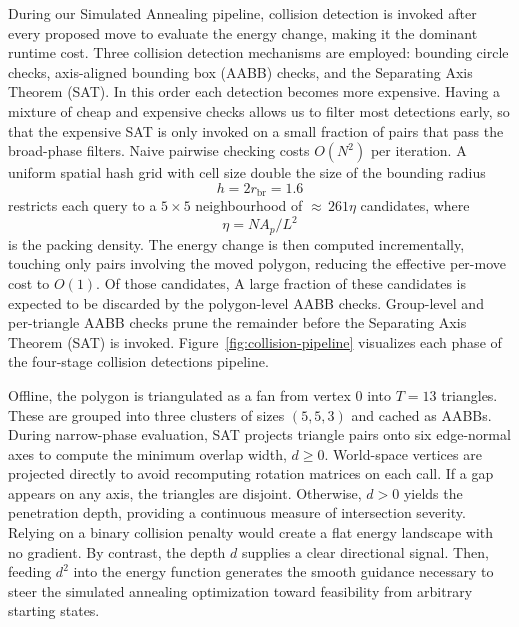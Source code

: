 \documentclass[10pt]{article}
\begin{document}
During our Simulated Annealing pipeline,
 collision detection is invoked after every proposed move to evaluate
the energy change, making it the dominant runtime cost. Three collision detection
mechanisms are employed: bounding circle checks,
 axis-aligned bounding box (AABB) checks,
  and the Separating Axis Theorem (SAT).
  In this order each detection becomes more expensive.
  Having a mixture of cheap and expensive checks allows us to 
  filter most detections early, so that the expensive SAT is only invoked on a small
   fraction of pairs that pass the broad-phase filters.
Naive pairwise checking costs $O(N^2)$ per iteration. 
A uniform spatial hash grid
with cell size double the size of the bounding radius $$h = 2r_{\mathrm{br}} = 1.6$$ restricts each query to a
$5 \times 5$ neighbourhood of ${\approx}\,261\eta$ candidates, where
$$\eta = NA_p/L^2$$ is the packing density. The energy change is then
computed incrementally, touching only pairs involving the moved
polygon, reducing the effective per-move cost to $O(1)$. Of those
candidates, A large fraction of these candidates is expected to be discarded by the
polygon-level AABB checks. Group-level and per-triangle
AABB checks prune the remainder before the Separating Axis Theorem
(SAT) is invoked. Figure~\ref{fig:collision-pipeline} visualizes
 each phase of the
four-stage collision detections pipeline.


Offline, the polygon is triangulated as a fan from vertex 0
 into $T = 13$ triangles. These are grouped into three clusters
  of sizes $(5, 5, 3)$ and cached as AABBs. 
  During narrow-phase evaluation, SAT projects triangle pairs onto
   six edge-normal axes to compute the minimum overlap width,
    $d \geq 0$. World-space vertices are projected directly
     to avoid recomputing rotation matrices on each call.
      If a gap appears on any axis, the triangles are disjoint.
       Otherwise, $d > 0$ yields the penetration depth,
        providing a continuous measure of intersection severity.
         Relying on a binary collision penalty would create a flat
          energy landscape with no gradient. By contrast,
           the depth $d$ supplies a clear directional signal.
            Then, feeding $d^2$ into the energy function generates
             the smooth guidance necessary to steer the simulated annealing 
             optimization toward feasibility from arbitrary
              starting states.
\end{document}
